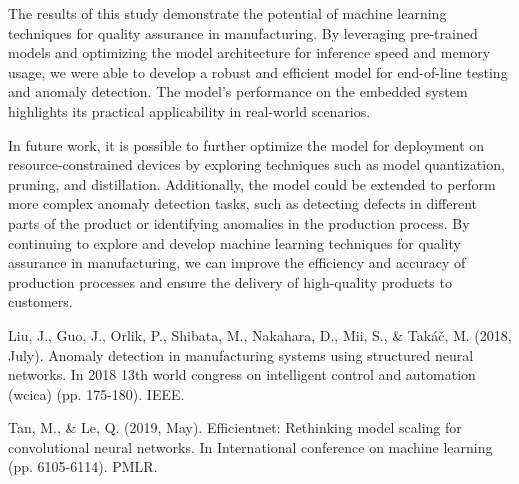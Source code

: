 \documentclass[lettersize,journal]{IEEEtran}
\begin{document}
The results of this study demonstrate the potential of machine learning techniques for quality assurance in manufacturing. By leveraging pre-trained models and optimizing the model architecture for inference speed and memory usage, we were able to develop a robust and efficient model for end-of-line testing and anomaly detection. The model's performance on the embedded system highlights its practical applicability in real-world scenarios. 

In future work, it is possible to further optimize the model for deployment on resource-constrained devices by exploring techniques such as model quantization, pruning, and distillation. Additionally, the model could be extended to perform more complex anomaly detection tasks, such as detecting defects in different parts of the product or identifying anomalies in the production process. By continuing to explore and develop machine learning techniques for quality assurance in manufacturing, we can improve the efficiency and accuracy of production processes and ensure the delivery of high-quality products to customers.


\begin{thebibliography}{1}



Liu, J., Guo, J., Orlik, P., Shibata, M., Nakahara, D., Mii, S., \&{} Takáč, M. (2018, July). Anomaly detection in manufacturing systems using structured neural networks. In 2018 13th world congress on intelligent control and automation (wcica) (pp. 175-180). IEEE.

Tan, M., \& Le, Q. (2019, May). Efficientnet: Rethinking model scaling for convolutional neural networks. In International conference on machine learning (pp. 6105-6114). PMLR.

\end{thebibliography}

\vfill
\end{document}
